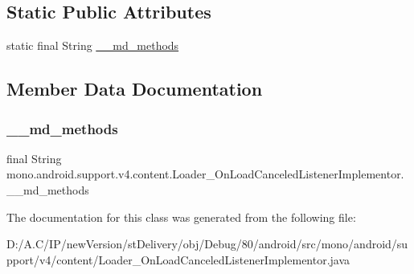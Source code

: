 \subsection*{Static Public Attributes}
\begin{DoxyCompactItemize}
\item 
static final String \hyperlink{classmono_1_1android_1_1support_1_1v4_1_1content_1_1_loader___on_load_canceled_listener_implementor_a1fb91411ee004f227bd993fdfb4f4747}{\+\_\+\+\_\+md\+\_\+methods}
\end{DoxyCompactItemize}


\subsection{Member Data Documentation}
\mbox{\label{classmono_1_1android_1_1support_1_1v4_1_1content_1_1_loader___on_load_canceled_listener_implementor_a1fb91411ee004f227bd993fdfb4f4747}} 
\subsubsection{\texorpdfstring{\+\_\+\+\_\+md\+\_\+methods}{\_\_md\_methods}}
{\footnotesize\ttfamily final String mono.\+android.\+support.\+v4.\+content.\+Loader\+\_\+\+On\+Load\+Canceled\+Listener\+Implementor.\+\_\+\+\_\+md\+\_\+methods\hspace{0.3cm}{\ttfamily [static]}}



The documentation for this class was generated from the following file\+:\begin{DoxyCompactItemize}
\item 
D\+:/\+A.\+C/\+I\+P/new\+Version/st\+Delivery/obj/\+Debug/80/android/src/mono/android/support/v4/content/Loader\+\_\+\+On\+Load\+Canceled\+Listener\+Implementor.\+java\end{DoxyCompactItemize}
